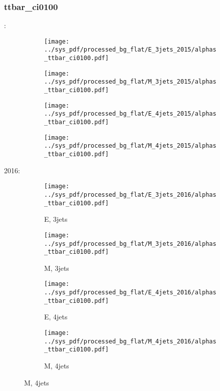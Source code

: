 \documentclass{beamer}
\begin{document}
\begin{frame}
\frametitle{ttbar_ci0100}
\fontsize{5}{1}:
\begin{figure}
\centering
\begin{subfigure}[b]{0.24\textwidth}
\texttt{[image: ../sys\_pdf/processed\_bg\_flat/E\_3jets\_2015/alphas\_ttbar\_ci0100.pdf]}
\end{subfigure}
\begin{subfigure}[b]{0.24\textwidth}
\texttt{[image: ../sys\_pdf/processed\_bg\_flat/M\_3jets\_2015/alphas\_ttbar\_ci0100.pdf]}
\end{subfigure}
\begin{subfigure}[b]{0.24\textwidth}
\texttt{[image: ../sys\_pdf/processed\_bg\_flat/E\_4jets\_2015/alphas\_ttbar\_ci0100.pdf]}
\end{subfigure}
\begin{subfigure}[b]{0.24\textwidth}
\texttt{[image: ../sys\_pdf/processed\_bg\_flat/M\_4jets\_2015/alphas\_ttbar\_ci0100.pdf]}
\end{subfigure}
\end{figure}
2016:
\begin{figure}
\centering
\begin{subfigure}[b]{0.24\textwidth}
\texttt{[image: ../sys\_pdf/processed\_bg\_flat/E\_3jets\_2016/alphas\_ttbar\_ci0100.pdf]}
\captionsetup{font=tiny}
\caption{E, 3jets}
\end{subfigure}
\begin{subfigure}[b]{0.24\textwidth}
\texttt{[image: ../sys\_pdf/processed\_bg\_flat/M\_3jets\_2016/alphas\_ttbar\_ci0100.pdf]}
\captionsetup{font=tiny}
\caption{M, 3jets}
\end{subfigure}
\begin{subfigure}[b]{0.24\textwidth}
\texttt{[image: ../sys\_pdf/processed\_bg\_flat/E\_4jets\_2016/alphas\_ttbar\_ci0100.pdf]}
\captionsetup{font=tiny}
\caption{E, 4jets}
\end{subfigure}
\begin{subfigure}[b]{0.24\textwidth}
\texttt{[image: ../sys\_pdf/processed\_bg\_flat/M\_4jets\_2016/alphas\_ttbar\_ci0100.pdf]}
\captionsetup{font=tiny}
\caption{M, 4jets}
\end{subfigure}
\end{figure}
\end{frame}
\end{document}
